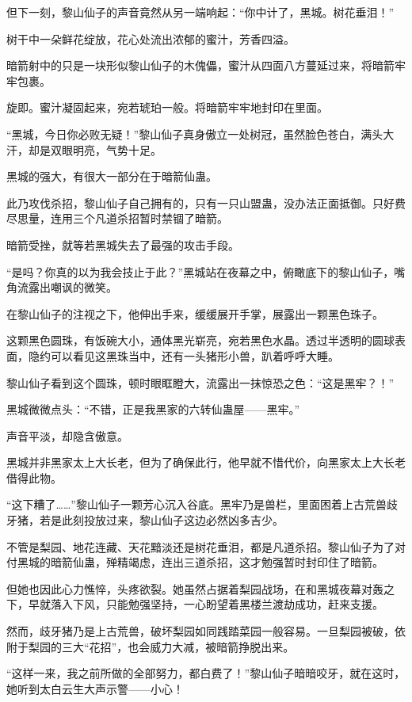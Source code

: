 \begin{this_body}
但下一刻，黎山仙子的声音竟然从另一端响起：“你中计了，黑城。树花垂泪！”

树干中一朵鲜花绽放，花心处流出浓郁的蜜汁，芳香四溢。

暗箭射中的只是一块形似黎山仙子的木傀儡，蜜汁从四面八方蔓延过来，将暗箭牢牢包裹。

旋即。蜜汁凝固起来，宛若琥珀一般。将暗箭牢牢地封印在里面。

“黑城，今日你必败无疑！”黎山仙子真身傲立一处树冠，虽然脸色苍白，满头大汗，却是双眼明亮，气势十足。

黑城的强大，有很大一部分在于暗箭仙蛊。

此乃攻伐杀招，黎山仙子自己拥有的，只有一只山盟蛊，没办法正面抵御。只好费尽思量，连用三个凡道杀招暂时禁锢了暗箭。

暗箭受挫，就等若黑城失去了最强的攻击手段。

“是吗？你真的以为我会技止于此？”黑城站在夜幕之中，俯瞰底下的黎山仙子，嘴角流露出嘲讽的微笑。

在黎山仙子的注视之下，他伸出手来，缓缓展开手掌，展露出一颗黑色珠子。

这颗黑色圆珠，有饭碗大小，通体黑光崭亮，宛若黑色水晶。透过半透明的圆球表面，隐约可以看见这黑珠当中，还有一头猪形小兽，趴着呼呼大睡。

黎山仙子看到这个圆珠，顿时眼眶瞪大，流露出一抹惊恐之色：“这是黑牢？！”

黑城微微点头：“不错，正是我黑家的六转仙蛊屋——黑牢。”

声音平淡，却隐含傲意。

黑城并非黑家太上大长老，但为了确保此行，他早就不惜代价，向黑家太上大长老借得此物。

“这下糟了……”黎山仙子一颗芳心沉入谷底。黑牢乃是兽栏，里面困着上古荒兽歧牙猪，若是此刻投放过来，黎山仙子这边必然凶多吉少。

不管是梨园、地花连藏、天花黯淡还是树花垂泪，都是凡道杀招。黎山仙子为了对付黑城的暗箭仙蛊，殚精竭虑，连出三道杀招，这才勉强暂时封印住了暗箭。

但她也因此心力憔悴，头疼欲裂。她虽然占据着梨园战场，在和黑城夜幕对轰之下，早就落入下风，只能勉强坚持，一心盼望着黑楼兰渡劫成功，赶来支援。

然而，歧牙猪乃是上古荒兽，破坏梨园如同践踏菜园一般容易。一旦梨园被破，依附于梨园的三大“花招”，也会威力大减，被暗箭挣脱出来。

“这样一来，我之前所做的全部努力，都白费了！”黎山仙子暗暗咬牙，就在这时，她听到太白云生大声示警——小心！


\end{this_body}

